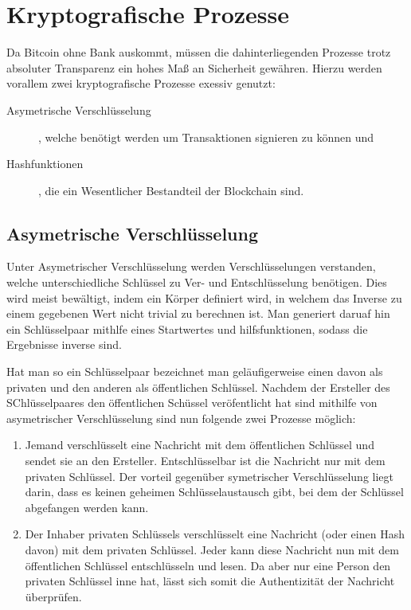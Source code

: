 \section{Kryptografische Prozesse}

Da Bitcoin ohne Bank auskommt, müssen die dahinterliegenden Prozesse trotz absoluter Transparenz ein hohes Maß an Sicherheit gewähren.
Hierzu werden vorallem zwei kryptografische Prozesse exessiv genutzt:
\begin{description}
    \item[Asymetrische Verschlüsselung], welche benötigt werden um Transaktionen signieren zu können und
    \item[Hashfunktionen], die ein Wesentlicher Bestandteil der Blockchain sind.
\end{description}

\subsection{Asymetrische Verschlüsselung}

Unter Asymetrischer Verschlüsselung werden Verschlüsselungen verstanden, welche unterschiedliche Schlüssel zu Ver- und Entschlüsselung benötigen.
Dies wird meist bewältigt, indem ein Körper definiert wird, in welchem das Inverse zu einem gegebenen Wert nicht trivial zu berechnen ist.
Man generiert daruaf hin ein Schlüsselpaar mithlfe eines Startwertes und hilfsfunktionen, sodass die Ergebnisse inverse sind.

Hat man so ein Schlüsselpaar bezeichnet man geläufigerweise einen davon als privaten und den anderen als öffentlichen Schlüssel.
Nachdem der Ersteller des SChlüsselpaares den öffentlichen Schüssel veröfentlicht hat sind mithilfe von asymetrischer Verschlüsselung sind nun folgende zwei Prozesse möglich:
\begin{enumerate}
    \item Jemand verschlüsselt eine Nachricht mit dem öffentlichen Schlüssel und sendet sie an den Ersteller.
    Entschlüsselbar ist die Nachricht nur mit dem privaten Schlüssel.
    Der vorteil gegenüber symetrischer Verschlüsselung liegt darin, dass es keinen geheimen Schlüsselaustausch gibt, bei dem der Schlüssel abgefangen werden kann.
    \item Der Inhaber privaten Schlüssels verschlüsselt eine Nachricht (oder einen Hash davon) mit dem privaten Schlüssel.
    Jeder kann diese Nachricht nun mit dem öffentlichen Schlüssel entschlüsseln und lesen.
    Da aber nur eine Person den privaten Schlüssel inne hat, lässt sich somit die Authentizität der Nachricht überprüfen.
\end{enumerate}

